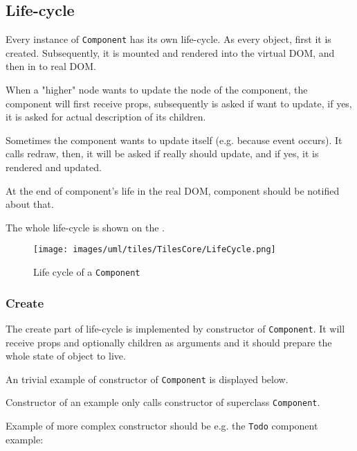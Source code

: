   \subsection{Life-cycle}\label{subsec:our-architecture-lifecycle}

    Every instance of \texttt{Component} has its own life-cycle. 
    As every object, first it is created. 
    Subsequently, it is mounted and rendered into the virtual DOM, and then in to real DOM.

    When a "higher" node wants to update the node of the component, 
    the component will first receive props, 
    subsequently is asked if want to update, 
    if yes, it is asked for actual description of its children. 

    Sometimes the component wants to update itself (e.g. because event occurs).
    It calls redraw, then, it will be asked if really should update, and if yes, it is rendered and updated.

    At the end of component's life in the real DOM, 
    component should be notified about that.

    The whole life-cycle is shown on the .

    \begin{figure}[h]
    \centering  
      \texttt{[image: images/uml/tiles/TilesCore/LifeCycle.png]}
      \caption{Life cycle of a \texttt{Component}}
      \label{img:our-life-cycle}
    \end{figure}

    \subsubsection{Create}\label{subsec:our-architecture-lifecycle-create}

      The create part of life-cycle is implemented by constructor of \texttt{Component}. 
      It will receive props and optionally children as arguments and 
      it should prepare the whole state of object to live.

      An trivial example of constructor of \texttt{Component} is displayed below.
      

      Constructor of an example only calls constructor of superclass \texttt{Component}.

      Example of more complex constructor should be e.g. the \texttt{Todo} component example:
      

